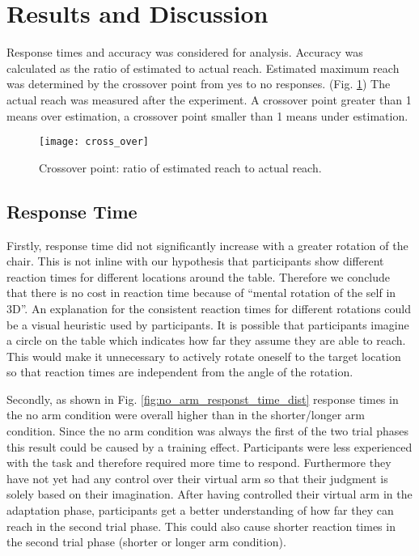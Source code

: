 \section{Results and Discussion}

Response times and accuracy was considered for analysis. Accuracy was calculated as the ratio of estimated to actual reach. Estimated maximum reach was determined by the crossover point from yes to no responses. (Fig. \ref{fig:cross_over}) The actual reach was measured after the experiment. A crossover point greater than 1 means over estimation, a crossover point smaller than 1 means under estimation. 

\begin{figure}
\centering
  \texttt{[image: cross\_over]}
  \caption{Crossover point: ratio of estimated reach to actual reach.} 
  \label{fig:cross_over}
\end{figure}

\subsection{Response Time}

Firstly, response time did not significantly increase with a greater rotation of the chair. This is not inline with our hypothesis that participants show different reaction times for different locations around the table. Therefore we conclude that there is no cost in reaction time because of “mental rotation of the self in 3D”. An explanation for the consistent reaction times for different rotations could be a visual heuristic used by participants. It is possible that participants imagine a circle on the table which indicates how far they assume they are able to reach. This would make it unnecessary to actively rotate oneself to the target location so that reaction times are independent from the angle of the rotation.

Secondly, as shown in Fig. \ref{fig:no_arm_responst_time_dist} response times in the no arm condition were overall higher than in the shorter/longer arm condition. Since the no arm condition was always the first of the two trial phases this result could be caused by a training effect. Participants were less experienced with the task and therefore required more time to respond. Furthermore they have not yet had any control over their virtual arm so that their judgment is solely based on their imagination.  After having controlled their virtual arm in the adaptation phase, participants get a better understanding of how far they can reach in the second trial phase. This could also cause shorter reaction times in the second trial phase (shorter or longer arm condition).

